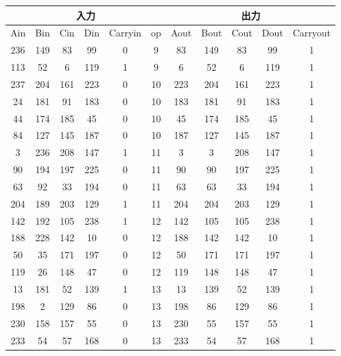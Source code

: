 \documentclass[12pt]{jreport}
\begin{document}
        \begin{table}[H]
            \begin{center}
                \begin{tabular} {|c|c|c|c|c|c|c|c|c|c|c|} \hline
                    \multicolumn{6}{|c|}{入力} & \multicolumn{5}{|c|}{出力} \\ \hline \hline
                    Ain & Bin & Cin & Din & Carryin & op & Aout & Bout & Cout & Dout & Carryout \\ \hline
                    236 & 149 & 83 & 99 & 0 & 9 & 83 & 149 & 83 & 99  & 1 \\ \hline
                    113 & 52 & 6 & 119 & 1 & 9 & 6 & 52 & 6 & 119 & 1 \\ \hline

                    237 & 204 & 161 & 223 & 0 & 10 & 223 & 204 & 161 & 223  & 1 \\ \hline
                    24 & 181 & 91 & 183 & 0 & 10 & 183 & 181 & 91 & 183 & 1 \\ \hline
                    44 & 174 & 185 & 45 & 0 & 10 & 45 & 174 & 185 & 45 & 1 \\ \hline
                    84 & 127 & 145 & 187 & 0 & 10 & 187 & 127 & 145 & 187 & 1 \\ \hline

                    3 & 236 & 208 & 147 & 1 & 11 & 3 & 3 & 208 & 147 & 1 \\ \hline
                    90 & 194 & 197 & 225 & 0 & 11 & 90 & 90 & 197 & 225 & 1 \\ \hline
                    63 & 92 & 33 & 194 & 0 & 11 & 63 & 63 & 33 & 194 & 1 \\ \hline
                    204 & 189 & 203 & 129 & 1 & 11 & 204 & 204 & 203 & 129 & 1 \\ \hline

                    142 & 192 & 105 & 238 & 1 & 12 & 142 & 105 & 105 & 238 & 1 \\ \hline
                    188 & 228 & 142 & 10 & 0 & 12 & 188 & 142 & 142 & 10 & 1 \\ \hline
                    50 & 35 & 171 & 197 & 0 & 12 & 50 & 171 & 171 & 197 & 1 \\ \hline
                    119 & 26 & 148 & 47 & 0 & 12 & 119 & 148 & 148 & 47 & 1 \\ \hline

                    13 & 181 & 52 & 139 & 1 & 13 & 13 & 139 & 52 & 139 & 1 \\ \hline
                    198 & 2 & 129 & 86 & 0 & 13 & 198 & 86 & 129 & 86 & 1 \\ \hline
                    230 & 158 & 157 & 55 & 0 & 13 & 230 & 55 & 157 & 55 & 1 \\ \hline
                    233 & 54 & 57 & 168 & 0 & 13 & 233 & 54 & 57 & 168 & 1 \\ \hline


\end{tabular}
\end{center}
\end{table}
\end{document}
